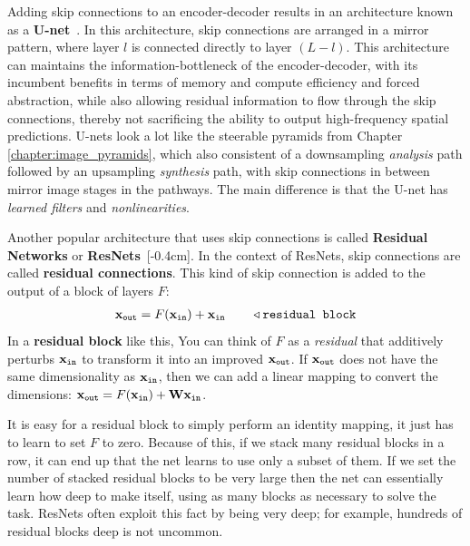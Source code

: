 Adding skip connections to an encoder-decoder results in an architecture known as a {\bf U-net}~\cite{ronneberger2015u}. In this architecture, skip connections are arranged in a mirror pattern, where layer $l$ is connected directly to layer $(L-l)$. This architecture can maintains the information-bottleneck of the encoder-decoder, with its incumbent benefits in terms of memory and compute efficiency and forced abstraction, while also allowing residual information to flow through the skip connections, thereby not sacrificing the ability to output high-frequency spatial predictions. U-nets look a lot like the steerable pyramids from Chapter \ref{chapter:image_pyramids}, which also consistent of a downsampling \textit{analysis} path followed by an upsampling \textit{synthesis} path, with skip connections in between mirror image stages in the pathways. The main difference is that the U-net has \textit{learned filters} and \textit{nonlinearities}.

Another popular architecture that uses skip connections is called {\bf Residual Networks} or {\bf ResNets}~\cite{he2016deep}[-0.4cm]. In the context of ResNets, skip connections are called {\bf residual connections}. This kind of skip connection is added to the output of a block of layers $F$:
\begin{align}
    \mathbf{x}_{\texttt{out}} = F(\mathbf{x}_{\texttt{in}}) + \mathbf{x}_{\texttt{in}} \quad\quad  \triangleleft \texttt{residual block}
\end{align}
In a {\bf residual block} like this, You can think of $F$ as a \textit{residual} that additively perturbs $\mathbf{x}_{\texttt{in}}$ to transform it into an improved $\mathbf{x}_{\texttt{out}}$. If $\mathbf{x}_{\texttt{out}}$ does not have the same dimensionality as $\mathbf{x}_{\texttt{in}}$, then we can add a linear mapping to convert the dimensions: $\mathbf{x}_{\texttt{out}} = F(\mathbf{x}_{\texttt{in}}) + \mathbf{W}\mathbf{x}_{\texttt{in}}$.

It is easy for a residual block to simply perform an identity mapping, it just has to learn to set $F$ to zero. Because of this, if we stack many residual blocks in a row, it can end up that the net learns to use only a subset of them. If we set the number of stacked residual blocks to be very large then the net can essentially learn how deep to make itself, using as many blocks as necessary to solve the task. ResNets often exploit this fact by being very deep; for example, hundreds of residual blocks deep is not uncommon. 




